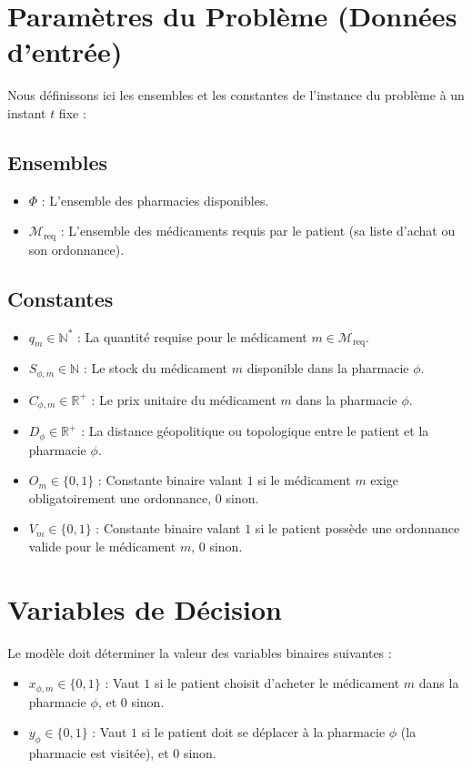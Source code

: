 \documentclass[12pt,a4paper]{report}
\begin{document}
	\section{Paramètres du Problème (Données d'entrée)}
	Nous définissons ici les ensembles et les constantes de l'instance du problème à un instant $t$ fixe :
	
	\subsection{Ensembles}
	\begin{itemize}
		\item[$\bullet$] $\Phi$ : L'ensemble des pharmacies disponibles.
		\item[$\bullet$] $\mathcal{M}_{\text{req}}$ : L'ensemble des médicaments requis par le patient (sa liste d'achat ou son ordonnance).
	\end{itemize}
	
	\subsection{Constantes}
	\begin{itemize}
		\item[$\bullet$] $q_m \in \mathbb{N}^*$ : La quantité requise pour le médicament $m \in \mathcal{M}_{\text{req}}$.
		\item[$\bullet$] $S_{\phi, m} \in \mathbb{N}$ : Le stock du médicament $m$ disponible dans la pharmacie $\phi$.
		\item[$\bullet$] $C_{\phi, m} \in \mathbb{R}^+$ : Le prix unitaire du médicament $m$ dans la pharmacie $\phi$.
		\item[$\bullet$] $D_\phi \in \mathbb{R}^+$ : La distance géopolitique ou topologique entre le patient et la pharmacie $\phi$.
		\item[$\bullet$] $O_m \in \{0, 1\}$ : Constante binaire valant $1$ si le médicament $m$ exige obligatoirement une ordonnance, $0$ sinon.
		\item[$\bullet$] $V_m \in \{0, 1\}$ : Constante binaire valant $1$ si le patient possède une ordonnance valide pour le médicament $m$, $0$ sinon.
	\end{itemize}
	
	\section{Variables de Décision}
	Le modèle doit déterminer la valeur des variables binaires suivantes :
	\begin{itemize}
		\item[$\bullet$] $x_{\phi, m} \in \{0, 1\}$ : Vaut $1$ si le patient choisit d'acheter le médicament $m$ dans la pharmacie $\phi$, et $0$ sinon.
		\item[$\bullet$] $y_\phi \in \{0, 1\}$ : Vaut $1$ si le patient doit se déplacer à la pharmacie $\phi$ (la pharmacie est visitée), et $0$ sinon.
	\end{itemize}
	
\end{document}
